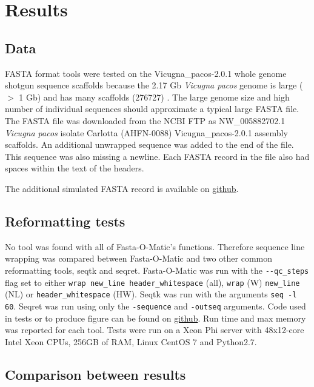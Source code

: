 \section{Results}

\subsection{Data}

FASTA format tools were tested on the Vicugna\_pacos-2.0.1 whole genome shotgun sequence scaffolds because the 2.17 Gb \textit{Vicugna pacos} genome is large ($>$ 1 Gb) and has many scaffolds (276727) \cite{Lindblad_Toh_2011}. The large genome size and high number of individual sequences should approximate a typical large FASTA file. The FASTA file was downloaded from the NCBI FTP as NW\_005882702.1 \textit{Vicugna pacos} isolate Carlotta (AHFN-0088) Vicugna\_pacos-2.0.1 assembly scaffolds.
An additional unwrapped sequence was added to the end of the file. This sequence was also missing a newline. Each FASTA record in the file also had spaces within the text of the headers.

The additional simulated FASTA record is available on \href{https://github.com/kstatebioinfo/Fasta-O-Matic-a-tool-to-sanity-check-and-if-needed-reformat-FASTA-files/blob/master/simulated_unwrapped.fa}{github}.

\subsection{Reformatting tests}
No tool was found with all of Fasta-O-Matic's functions. Therefore sequence line wrapping was compared between Fasta-O-Matic and two other common reformatting tools, seqtk and seqret. Fasta-O-Matic was run with the \verb|--qc_steps| flag set to either \verb|wrap new_line header_whitespace| (all), \verb|wrap| (W) \verb|new_line| (NL) or \verb|header_whitespace| (HW). Seqtk was run with the arguments \verb|seq -l 60|. Seqret was run using only the \verb|-sequence| and \verb|-outseq| arguments. Code used in tests or to produce figure can be found on \href{https://github.com/kstatebioinfo/Fasta-O-Matic-a-tool-to-sanity-check-and-if-needed-reformat-FASTA-files/tree/master/figures}{github}. Run time and max memory was reported for each tool. Tests were run on a Xeon Phi server with 48x12-core Intel Xeon CPUs, 256GB of RAM, Linux CentOS 7 and Python2.7.

\subsection{Comparison between results}

